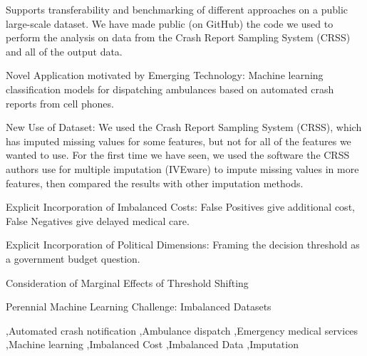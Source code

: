 \documentclass[fleqn]{cas-sc}
\begin{document}
\begin{highlights}
	\item  Supports transferability and benchmarking of different approaches on a public large-scale dataset.  We have made public (on GitHub) the code we used to perform the analysis on data from the Crash Report Sampling System (CRSS) and all of the output data.  
	\item Novel Application motivated by Emerging Technology:  Machine learning classification models for dispatching ambulances based on automated crash reports from cell phones.  
	\item New Use of Dataset:  We used the Crash Report Sampling System (CRSS), which has imputed missing values for some features, but not for all of the features we wanted to use.  For the first time we have seen, we used the software the CRSS authors use for multiple imputation (IVEware) to impute missing values in more features, then compared the results with other imputation methods.
	\item Explicit Incorporation of Imbalanced Costs:  False Positives give additional cost, False Negatives give delayed medical care.
	\item Explicit Incorporation of Political Dimensions: Framing the decision threshold as a government budget question.
	\item Consideration of Marginal Effects of Threshold Shifting
	\item Perennial Machine Learning Challenge:  Imbalanced Datasets
\end{highlights}

\begin{keywords}
 \sep Automated crash notification 
 \sep Ambulance dispatch 
 \sep Emergency medical services  
 \sep Machine learning 
 \sep Imbalanced Cost 
 \sep Imbalanced Data 
 \sep Imputation
\end{keywords}

\maketitle


%
%
%





\end{document}
